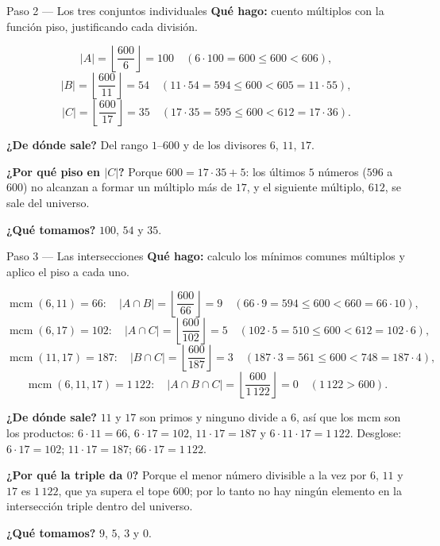 \documentclass[11pt]{article}
\begin{document}
\begin{paso}{Paso 2 --- Los tres conjuntos individuales}
\textbf{Qué hago:} cuento múltiplos con la función piso, justificando cada división.

\[
|A| = \left\lfloor \frac{600}{6}\right\rfloor = 100 \quad (6\cdot 100 = 600 \le 600 < 606),
\]
\[
|B| = \left\lfloor \frac{600}{11}\right\rfloor = 54 \quad (11\cdot 54 = 594\le 600 < 605 = 11\cdot 55),
\]
\[
|C| = \left\lfloor \frac{600}{17}\right\rfloor = 35 \quad (17\cdot 35 = 595\le 600 < 612 = 17\cdot 36).
\]

\textbf{¿De dónde sale?} Del rango $1$--$600$ y de los divisores $6$, $11$, $17$.

\textbf{¿Por qué piso en $|C|$?} Porque $600 = 17\cdot 35 + 5$: los últimos $5$ números ($596$ a $600$) no alcanzan a formar un múltiplo más de $17$, y el siguiente múltiplo, $612$, se sale del universo.

\textbf{¿Qué tomamos?} $100$, $54$ y $35$.
\end{paso}

\begin{paso}{Paso 3 --- Las intersecciones}
\textbf{Qué hago:} calculo los mínimos comunes múltiplos y aplico el piso a cada uno.

\[
\operatorname{mcm}(6,11) = 66:\quad |A\cap B| = \left\lfloor \frac{600}{66}\right\rfloor = 9 \quad (66\cdot 9 = 594\le 600 < 660 = 66\cdot 10),
\]
\[
\operatorname{mcm}(6,17) = 102:\quad |A\cap C| = \left\lfloor \frac{600}{102}\right\rfloor = 5 \quad (102\cdot 5 = 510\le 600 < 612 = 102\cdot 6),
\]
\[
\operatorname{mcm}(11,17) = 187:\quad |B\cap C| = \left\lfloor \frac{600}{187}\right\rfloor = 3 \quad (187\cdot 3 = 561\le 600 < 748 = 187\cdot 4),
\]
\[
\operatorname{mcm}(6,11,17) = 1\,122:\quad |A\cap B\cap C| = \left\lfloor \frac{600}{1\,122}\right\rfloor = 0 \quad (1\,122 > 600).
\]

\textbf{¿De dónde sale?} $11$ y $17$ son primos y ninguno divide a $6$, así que los mcm son los productos: $6\cdot 11 = 66$, $6\cdot 17 = 102$, $11\cdot 17 = 187$ y $6\cdot 11\cdot 17 = 1\,122$. Desglose: $6\cdot 17 = 102$; $11\cdot 17 = 187$; $66\cdot 17 = 1\,122$.

\textbf{¿Por qué la triple da $0$?} Porque el menor número divisible a la vez por $6$, $11$ y $17$ es $1\,122$, que ya supera el tope $600$; por lo tanto no hay ningún elemento en la intersección triple dentro del universo.

\textbf{¿Qué tomamos?} $9$, $5$, $3$ y $0$.
\end{paso}
\end{document}
